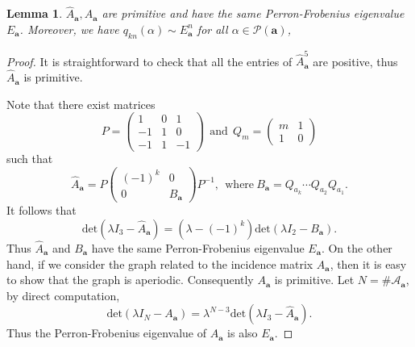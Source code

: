\documentclass[10pt,a4paper]{amsart}
\newtheorem{lemma}{Lemma}
\newcommand{\ma}{\mathbf{a}}
\begin{document}
	\begin{lemma}\label{primitive}
		$\hat{A}_{\ma},A_{\ma}$ are primitive and have the same Perron-Frobenius eigenvalue $E_{\ma}$. Moreover, we have $q_{kn}(\alpha)\sim E_{\ma}^n$ for all $\alpha\in\mathcal{P}(\ma)$, 
	\end{lemma}

	\begin{proof}
		It is straightforward to check that all the entries of $\hat{A}_{\ma}^5$ are positive,
		thus $\hat{A}_{\ma}$ is primitive. 
		
		Note that there exist matrices $$
		P=\left(\begin{array}{ccc}
			1&0&1\\
			-1&1&0\\ 
			-1&1&-1
		\end{array}\right)\ \ \text{and}\ \ Q_m=\left(%
		\begin{array}{cc}
			m & 1 \\ 
			1 & 0%
		\end{array}%
		\right)$$
		such that 
		\begin{equation*}
			\hat{A}_{\ma}=P\left(\begin{array}{cc}
				(-1)^k&0\\
				0&B_{\ma} 
			\end{array}\right)P^{-1},\ \  \text{where}\ B_{\mathbf{a}}=Q_{a_k}\cdots Q_{a_{2}}Q_{a_1}.
		\end{equation*}
		It follows that 
		$$\text{det}(\lambda I_3-\hat{A}_{\ma})=(\lambda-(-1)^k)\text{det}(\lambda I_2-B_{\ma}).$$
		Thus $\hat{A}_{\ma}$ and $B_{\ma}$ have the same Perron-Frobenius eigenvalue $E_{\ma}$. On the other hand, if we consider the graph related to the incidence matrix $A_{\ma}$, then it is easy to show that the graph is aperiodic. Consequently $A_{\ma}$ is primitive. Let $N=\#\mathscr{A}_{\ma}$, by direct computation,
		$$\text{det}(\lambda I_N-A_{\ma})=\lambda^{N-3}\text{det}(\lambda I_3-\hat{A}_{\ma}).$$
		Thus the Perron-Frobenius eigenvalue of $A_{\ma}$ is also $E_{\ma}$.
		

\end{proof}
\end{document}
